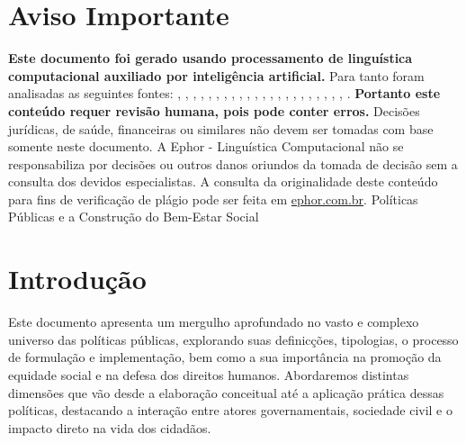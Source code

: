 \documentclass[
   article,       
   12pt,          
   oneside,       
   a4paper,       
   english,       
   brazil,        
   sumario=tradicional
   ]{abntex2}
\begin{document}
\frenchspacing 
\maketitle

\textual
\section{Aviso Importante}
\textbf{Este documento foi gerado usando processamento de linguística computacional auxiliado por inteligência artificial.} Para tanto foram analisadas as seguintes fontes:  \cite{A_CAUSA_E_AS_POLITICAS_DE_DIREITOS_HUMANOS_NO}, \cite{Ciclo_de_Politicas_Publicas_por_que_e_importa}, \cite{Conheca_o_ciclo_das_politicas_publicas__Polit}, \cite{Educacao_Inclusiva_Conheca_o_historico_da_leg}, \cite{Em_Buenos_Aires_Silvio_Almeida_defende_a_inst}, \cite{Entendendo_a_Tipologia_de_Politicas_Publicas_}, \cite{Escola_Nacional_de_Administracao_Publica__Wik}, \cite{Especialista_em_politicas_publicas_e_gestao_g}, \cite{FEDERALISMO_E_POLITICAS_PUBLICAS_NO_BRASIL_Ho}, \cite{Institucionalizacao_das_politicas_em_Direitos}, \cite{Ministerio_do_Planejamento_e_Orcamento__Wikip}, \cite{Ministro_defende_que_direitos_humanos_precisa}, \cite{Politica_conceito_politicas_publicas_e_partid}, \cite{Politica_publica__o_que_e_tipos_de_politicas_}, \cite{Politica_publica__Wikipedia_a_enciclopedia_li}, \cite{Politicas_publicas__Wikipedia_la_enciclopedia}, \cite{Politicas_Publicas_entenda_o_que_sao_para_que}, \cite{Politicas_Publicas_o_que_sao_e_para_que_serve}, \cite{Politicas_publicas_o_que_sao_e_para_que_serve}, \cite{Politicas_publicas_o_que_sao_quem_faz_e_tipos}, \cite{Politicas_publicas_o_que_sao_tipos_e_exemplos}, \cite{Revista_USP_119__Dossie_1_Democracia_e_politi}, \cite{TCU_Ciclo_das_politicas_publicas__Tudo_o_que_}.
\textbf{Portanto este conteúdo requer revisão humana, pois pode conter erros.} Decisões jurídicas, de saúde, financeiras ou similares não devem ser tomadas com base somente neste documento. A Ephor - Linguística Computacional não se responsabiliza por decisões ou outros danos oriundos da tomada de decisão sem a consulta dos devidos especialistas.
A consulta da originalidade deste conteúdo para fins de verificação de plágio pode ser feita em \href{http://www.ephor.com.br}{ephor.com.br}.
Políticas Públicas e a Construção do Bem-Estar Social

\section{Introdução}
Este documento apresenta um mergulho aprofundado no vasto e complexo universo das políticas públicas, explorando suas definicções, tipologias, o processo de formulação e implementação, bem como a sua importância na promoção da equidade social e na defesa dos direitos humanos. Abordaremos distintas dimensões que vão desde a elaboração conceitual até a aplicação prática dessas políticas, destacando a interação entre atores governamentais, sociedade civil e o impacto direto na vida dos cidadãos.
\end{document}
